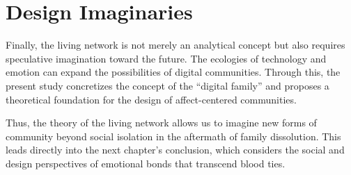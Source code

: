 \section{Design Imaginaries}
Finally, the living network is not merely an analytical concept but also requires speculative imagination toward the future. The ecologies of technology and emotion can expand the possibilities of digital communities. Through this, the present study concretizes the concept of the “digital family” and proposes a theoretical foundation for the design of affect-centered communities.  

Thus, the theory of the living network allows us to imagine new forms of community beyond social isolation in the aftermath of family dissolution. This leads directly into the next chapter’s conclusion, which considers the social and design perspectives of emotional bonds that transcend blood ties.  














